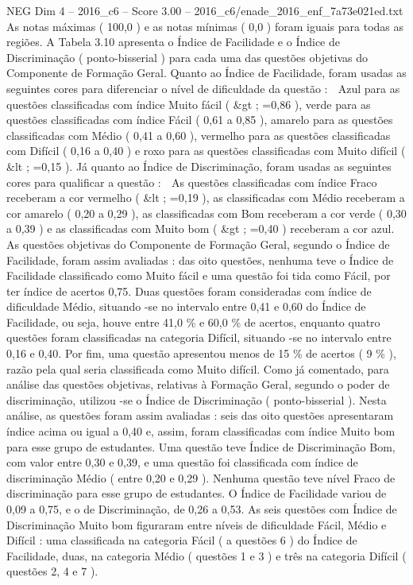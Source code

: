 \begin{textsample}{NEG Dim 4 – 2016\_c6 – Score 3.00 – 2016\_c6/enade\_2016\_enf\_7a73e021ed.txt}
As notas máximas ( 100,0 ) e as notas mínimas ( 0,0 ) foram iguais para todas as regiões.
A Tabela 3.10 apresenta o Índice de Facilidade e o Índice de Discriminação ( ponto-bisserial ) para cada uma das questões objetivas do Componente de Formação Geral.
Quanto ao Índice de Facilidade, foram usadas as seguintes cores para diferenciar o nível de dificuldade da questão :  Azul para as questões classificadas com índice Muito fácil ( \&gt ; =0,86 ), verde para as questões classificadas com índice Fácil ( 0,61 a 0,85 ), amarelo para as questões classificadas com Médio ( 0,41 a 0,60 ), vermelho para as questões classificadas com Difícil ( 0,16 a 0,40 ) e roxo para as questões classificadas com Muito difícil ( \&lt ; =0,15 ).
Já quanto ao Índice de Discriminação, foram usadas as seguintes cores para qualificar a questão :  As questões classificadas com índice Fraco receberam a cor vermelho ( \&lt ; =0,19 ), as classificadas com Médio receberam a cor amarelo ( 0,20 a 0,29 ), as classificadas com Bom receberam a cor verde ( 0,30 a 0,39 ) e as classificadas com Muito bom ( \&gt ; =0,40 ) receberam a cor azul.
As questões objetivas do Componente de Formação Geral, segundo o Índice de Facilidade, foram assim avaliadas : das oito questões, nenhuma teve o Índice de Facilidade classificado como Muito fácil e uma questão foi tida como Fácil, por ter índice de acertos 0,75.
Duas questões foram consideradas com índice de dificuldade Médio, situando -se no intervalo entre 0,41 e 0,60 do Índice de Facilidade, ou seja, houve entre 41,0 \% e 60,0 \% de acertos, enquanto quatro questões foram classificadas na categoria Difícil, situando -se no intervalo entre 0,16 e 0,40.
Por fim, uma questão apresentou menos de 15 \% de acertos ( 9 \% ), razão pela qual seria classificada como Muito difícil.
Como já comentado, para análise das questões objetivas, relativas à Formação Geral, segundo o poder de discriminação, utilizou -se o Índice de Discriminação ( ponto-bisserial ).
Nesta análise, as questões foram assim avaliadas : seis das oito questões apresentaram índice acima ou igual a 0,40 e, assim, foram classificadas com índice Muito bom para esse grupo de estudantes.
Uma questão teve Índice de Discriminação Bom, com valor entre 0,30 e 0,39, e uma questão foi classificada com índice de discriminação Médio ( entre 0,20 e 0,29 ).
Nenhuma questão teve nível Fraco de discriminação para esse grupo de estudantes.
O Índice de Facilidade variou de 0,09 a 0,75, e o de Discriminação, de 0,26 a 0,53.
As seis questões com Índice de Discriminação Muito bom figuraram entre níveis de dificuldade Fácil, Médio e Difícil : uma classificada na categoria Fácil ( a questões 6 ) do Índice de Facilidade, duas, na categoria Médio ( questões 1 e 3 ) e três na categoria Difícil ( questões 2, 4 e 7 ).

\end{textsample}

